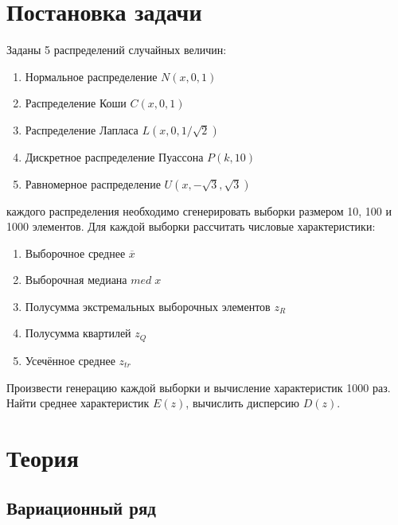 \documentclass[12pt]{article}
\begin{document}
\begin{flushleft}

\setlength{\parindent}{1cm}

\tableofcontents

\newpage

\listoftables

\newpage

\section{Постановка задачи}

	Заданы 5 распределений случайных величин:

	\begin{enumerate}
		\item Нормальное распределение $N(x, 0, 1)$
		\item Распределение Коши $C(x, 0, 1)$
		\item Распределение Лапласа $L(x, 0, 1/\sqrt{2})$
		\item Дискретное распределение Пуассона $P(k, 10)$
		\item Равномерное распределение $U(x, -\sqrt{3}, \sqrt{3})$
	\end{enumerate}

	 каждого распределения необходимо сгенерировать выборки размером 10, 100 и 1000 элементов. Для каждой выборки рассчитать числовые характеристики:

	\begin{enumerate}
		\item Выборочное среднее $\overline{x}$
		\item Выборочная медиана $med \; x$
		\item Полусумма экстремальных выборочных элементов $z_R$
		\item Полусумма квартилей $z_Q$
		\item Усечённое среднее $z_{tr}$
	\end{enumerate}

	Произвести генерацию каждой выборки и вычисление характеристик 1000 раз. Найти среднее характеристик $E(z)$, вычислить дисперсию $D(z)$. 

\newpage

\section{Теория}

	\subsection{Вариационный ряд}


\end{flushleft}
\end{document}
